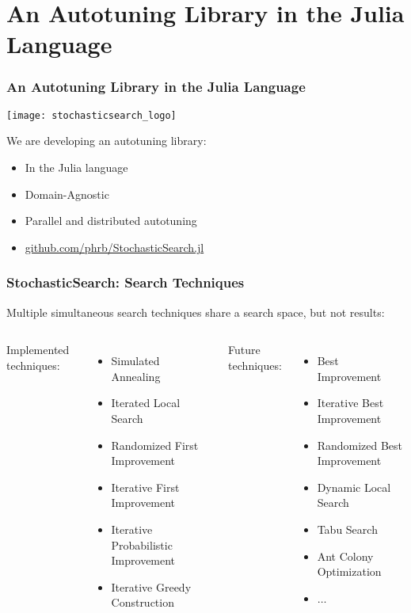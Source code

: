 \documentclass[10pt, compress, aspectratio=169, xcolor=table]{beamer}
\begin{document}
\section{An Autotuning Library in the Julia Language}

\begin{frame}
    \frametitle{An Autotuning Library in the Julia Language}
    \begin{center}
        \texttt{[image: stochasticsearch\_logo]}
    \end{center}

    We are developing an autotuning library:
    \begin{itemize}
        \item In the \alert{Julia} language
        \item \alert{Domain-Agnostic}
        \item \alert{Parallel and distributed autotuning}
        \item \url{github.com/phrb/StochasticSearch.jl}
    \end{itemize}
\end{frame}

\begin{frame}
    \frametitle{StochasticSearch: Search Techniques}
    Multiple \alert{simultaneous search techniques} share a search space, but
    not results:

    \vspace{.3cm}

    \begin{columns}[T,onlytextwidth]
        \alert{Implemented} techniques:
        \begin{itemize}
            \item Simulated Annealing
            \item Iterated Local Search
            \item Randomized First Improvement
            \item Iterative First Improvement
            \item Iterative Probabilistic Improvement
            \item Iterative Greedy Construction
        \end{itemize}

        \pause

        \alert{Future} techniques:
        \begin{itemize}
            \item Best Improvement
            \item Iterative Best Improvement
            \item Randomized Best Improvement
            \item Dynamic Local Search
            \item Tabu Search
            \item Ant Colony Optimization
            \item $\dots$
        \end{itemize}
    \end{columns}
\end{frame}
\end{document}
